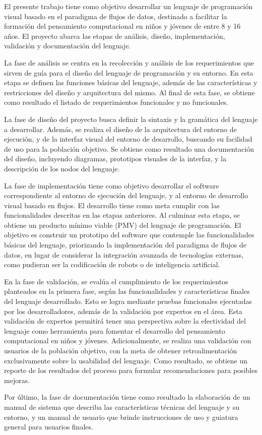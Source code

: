
El presente trabajo tiene como objetivo desarrollar un lenguaje de programación visual basado en el paradigma de flujos de datos, destinado a facilitar la formación del pensamiento computacional en niños y jóvenes de entre 8 y 16 años. El proyecto abarca las etapas de análisis, diseño, implementación, validación y documentación del lenguaje.

La fase de análisis se centra en la recolección y análisis de los requerimientos que sirven de guía para el diseño del lenguaje de programación y su entorno. En esta etapa se definen las funciones básicas del lenguaje, además de las características y restricciones del diseño y arquitectura del mismo. Al final de esta fase, se obtiene como resultado el listado de requerimientos funcionales y no funcionales.

La fase de diseño del proyecto busca definir la sintaxis y la gramática del lenguaje a desarrollar. Además, se realiza el diseño de la arquitectura del entorno de ejecución, y de la interfaz visual del entorno de desarrollo, buscando su facilidad de uso para la población objetivo. Se obtiene como resultado una documentación del diseño, incluyendo diagramas, prototipos visuales de la interfaz, y la descripción de los nodos del lenguaje.

La fase de implementación tiene como objetivo desarrollar el software correspondiente al entorno de ejecución del lenguaje, y al entorno de desarrollo visual basado en flujos. El desarrollo tiene como meta cumplir con las funcionalidades descritas en las etapas anteriores. Al culminar esta etapa, se obtiene un producto mínimo viable (PMV) del lenguaje de programación. El objetivo es construir un prototipo del software que contemple las funcionalidades básicas del lenguaje, priorizando la implementación del paradigma de flujos de datos, en lugar de considerar la integración avanzada de tecnologías externas, como pudieran ser la codificación de robots o de inteligencia artificial.

En la fase de validación, se evalúa el cumplimiento de los requerimientos planteados en la primera fase, según las funcionalidades y características finales del lenguaje desarrollado. Esto se logra mediante pruebas funcionales ejecutadas por los desarrolladores, además de la validación por expertos en el área. Esta validación de expertos permitirá tener una perspectiva sobre la efectividad del lenguaje como herramienta para fomentar el desarrollo del pensamiento computacional en niños y jóvenes. Adicionalmente, se realiza una validación con usuarios de la población objetivo, con la meta de obtener retroalimentación exclusivamente sobre la usabilidad del lenguaje. Como resultado, se obtiene un reporte de los resultados del proceso para formular recomendaciones para posibles mejoras.

Por último, la fase de documentación tiene como resultado la elaboración de un manual de sistema que describa las características técnicas del lenguaje y su entorno, y un manual de usuario que brinde instrucciones de uso y guiatura general para usuarios finales.
